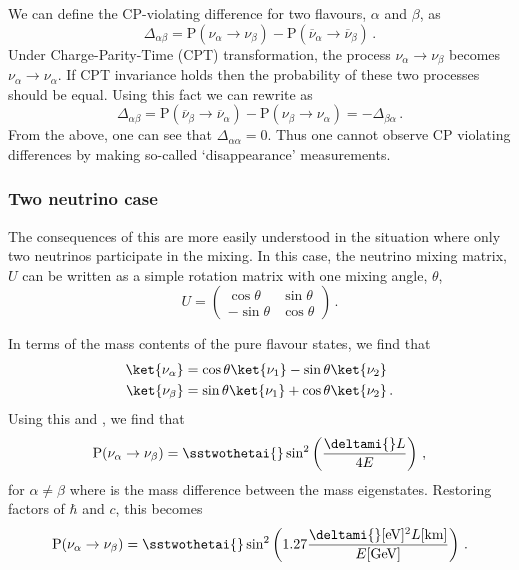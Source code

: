 We can define the CP-violating difference for two flavours, $\alpha$ and $\beta$, as
\begin{equation}
  \Delta_{\alpha \beta} = \text{P}(\nu_{\alpha} \rightarrow \nu_{\beta}) - \text{P}(\overline{\nu}_{\alpha} \rightarrow \overline{\nu}_{\beta}) \, .
  \label{eq:cpViolation}
\end{equation}
Under Charge-Parity-Time (CPT) transformation, the process $\nu_{\alpha} \rightarrow \nu_{\beta}$ becomes $\nu_{\alpha} \rightarrow \nu_{\alpha}$.
If CPT invariance holds then the probability of these two processes should be equal.
Using this fact we can rewrite  as
\begin{equation}
  \Delta_{\alpha \beta} = \text{P}(\overline{\nu}_{\beta} \rightarrow \overline{\nu}_{\alpha}) - \text{P}(\nu_{\beta} \rightarrow \nu_{\alpha}) = -\Delta_{\beta \alpha} \, .
\end{equation}
From the above, one can see that $\Delta_{\alpha \alpha} = 0$.
Thus one cannot observe CP violating differences by making so-called `disappearance' measurements.
  

\subsubsection{Two neutrino case}
\label{sec:theory:theory:twoNeutrino}

The consequences of this are more easily understood in the situation where only two neutrinos participate in the mixing.
In this case, the neutrino mixing matrix, $U$ can be written as a simple rotation matrix with one mixing angle, $\theta$,
\begin{equation}
  U =
  \begin{pmatrix}
    \cos\theta  & \sin\theta \\
    -\sin\theta & \cos\theta
  \end{pmatrix} \, .
\end{equation}

In terms of the mass contents of the pure flavour states, we find that
\begin{align}
  \ket{\nu_{\alpha}} &= \cos\theta\ket{\nu_{1}} - \sin\theta\ket{\nu_{2}} \\
  \ket{\nu_{\beta}}  &= \sin\theta\ket{\nu_{1}} + \cos\theta\ket{\nu_{2}} \, .
\end{align}
Using this and , we find that
\begin{equation}
  \text{P}(\nu_{\alpha}\rightarrow\nu_{\beta}) = \sstwothetai{} \sin^{2} \left(\frac{\deltami{} L}{4E} \right) \, ,
\end{equation}
for $\alpha \neq \beta$ where \deltami{} is the mass difference between the mass eigenstates.
Restoring factors of $\hbar$ and $c$, this becomes
\begin{equation}
  \text{P}(\nu_{\alpha}\rightarrow\nu_{\beta}) = \sstwothetai{} \sin^{2} \left( 1.27 \frac{\deltami{} [\text{eV}]^{2} L [\text{km}]}{E[\text{GeV}]} \right) \, .
  \label{eq:twoNuProb}
\end{equation}

